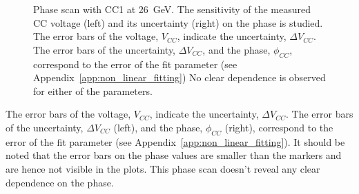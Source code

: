 \begin{figure}[!ht]
\begin{subfigure}[t]{0.45\textwidth}
   \end{subfigure}
   \hfill
    \caption{Phase scan with CC1 at 26\, GeV. The sensitivity of the measured CC voltage (left) and its uncertainty (right) on the phase is studied. The error bars of the voltage, $V_{CC}$, indicate the uncertainty, $\Delta V_{CC}$. The error bars of the uncertainty, $\Delta V_{CC}$, and the phase, $\phi_{CC}$, correspond to the error of the fit parameter (see Appendix~\ref{app:non_linear_fitting}) No clear dependence is observed for either of the parameters.
    }
    \label{fig:phase_scan_CC1}
\end{figure}

The error bars of the voltage, $V_{CC}$, indicate the uncertainty, $\Delta V_{CC}$. The error bars of the uncertainty, $\Delta V_{CC}$ (left), and the phase, $\phi_{CC}$ (right), correspond to the error of the fit parameter (see Appendix~\ref{app:non_linear_fitting}). It should be noted that the error bars on the 
phase values are smaller than the markers and are hence not visible in the plots. This phase scan doesn't reveal any clear dependence on the phase.


